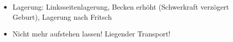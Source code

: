\label{m:fruchtwasserabgang}
\begin{itemize}
    \item Lagerung: Linksseitenlagerung, Becken erhöht
    (Schwerkraft verzögert Geburt), Lagerung nach Fritsch
    \item Nicht mehr aufstehen lassen! Liegender Transport!
\end{itemize}